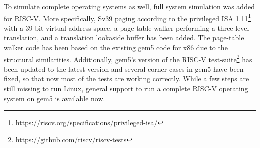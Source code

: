 To simulate complete operating systems as well, full system simulation was added for RISC-V.
More specifically, Sv39 paging according to the privileged ISA 1.11\footnote{\url{https://riscv.org/specifications/privileged-isa/}} with a 39-bit virtual address space, a page-table walker performing a three-level translation, and a translation lookaside buffer has been added.
The page-table walker code has been based on the existing gem5 code for x86 due to the structural similarities.
Additionally, gem5's version of the RISC-V test-suite\footnote{\url{https://github.com/riscv/riscv-tests}} has been updated to the latest version and several corner cases in gem5 have been fixed, so that now most of the tests are working correctly.
While a few steps are still missing to run Linux, general support to run a complete RISC-V operating system on gem5 is available now.

